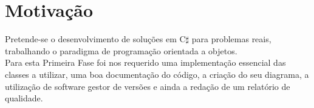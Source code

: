 \section{Motivação}Pretende-se o desenvolvimento de soluções em C$\sharp$ para problemas reais, trabalhando o paradigma de 
programação orientada a objetos.\\
Para esta Primeira Fase foi nos requerido uma implementação essencial das classes a utilizar, uma boa documentação do código, a criação do seu diagrama, a utilização de software gestor de versões e ainda a redação de um relatório de qualidade.